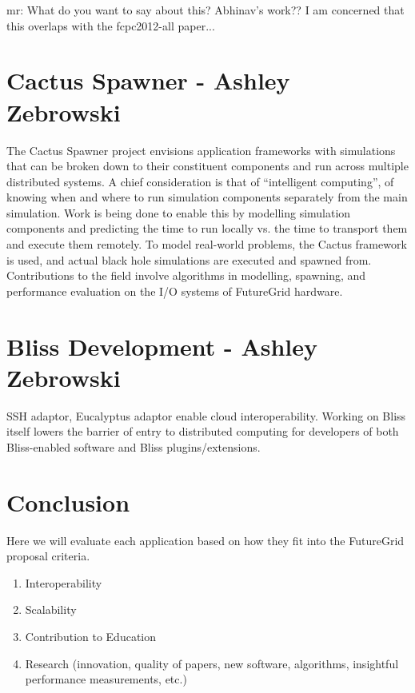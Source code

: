 \documentclass[]{paper}
\begin{document}
mr: What do you want to say about this? Abhinav's work?? I am concerned that this overlaps with the fcpc2012-all paper...



\section{Cactus Spawner - Ashley Zebrowski}
The Cactus Spawner project envisions application frameworks with simulations that
can be broken down to their constituent components and run across multiple
distributed systems.  A chief consideration is that of ``intelligent computing'',
of knowing when and where to run simulation components separately from the main
simulation.  Work is being done to enable this by modelling simulation components
and predicting the time to run locally vs. the time to transport them and execute
them remotely.  To model real-world problems, the Cactus framework is used, and
actual black hole simulations are executed and spawned from.  Contributions
to the field involve algorithms in modelling, spawning, and performance evaluation on
the I/O systems of FutureGrid hardware.

\section{Bliss Development - Ashley Zebrowski}
SSH adaptor, Eucalyptus adaptor enable cloud interoperability.  Working on 
Bliss itself lowers the barrier of entry to distributed computing for developers
of both Bliss-enabled software and Bliss plugins/extensions.

\section{Conclusion}
Here we will evaluate each application based on how they fit into the FutureGrid proposal
criteria.
\begin{enumerate}
\item Interoperability
\item Scalability
\item Contribution to Education
\item Research (innovation, quality of papers, new software, algorithms, insightful performance measurements, etc.)

\end{enumerate}
\begin{thebibliography}{9}
\end{thebibliography}
\end{document}
